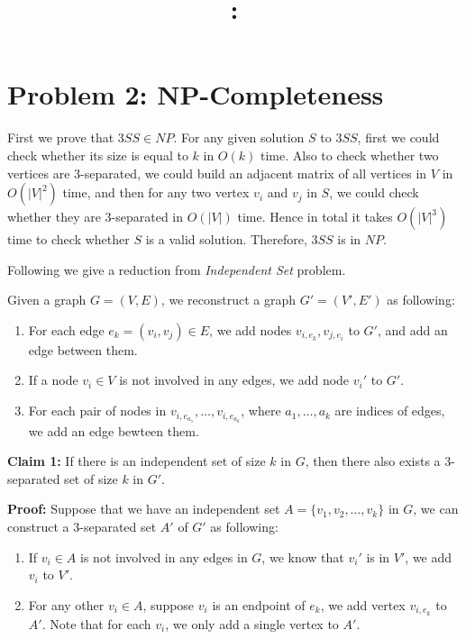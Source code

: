 \documentclass{article}
\title{\textmd{\bf \Class: \Title}}
\date{}
\author{\textbf{\StudentName}}
\begin{document}
\maketitle \thispagestyle{empty}
\section*{Problem 2: NP-Completeness}
First we prove that $3SS \in NP$. For any given solution $S$ to $3SS$, first we could check whether 
its size is equal to $k$ in $O(k)$ time. Also to check whether two vertices are $3$-separated, we
could build an adjacent matrix of all vertices in $V$ in $O(|V|^2)$ time, and then for any two
vertex $v_i$ and $v_j$ in $S$, we could check whether they are $3$-separated in $O(|V|)$ time. Hence
in total it takes $O(|V|^3)$ time to check whether $S$ is a valid solution. Therefore, $3SS$ is in
$NP$.    

Following we give a reduction from \textit{Independent Set} problem.

Given a graph $G = (V, E)$, we reconstruct a graph $G' = (V', E')$ as following:
\begin{enumerate}
  \item For each edge $e_k = (v_i, v_j) \in E$, we add nodes $v_{i, e_k}, v_{j, e_i}$ to $G'$, and add an edge
    between them.
  \item If a node $v_i \in V$ is not involved in any edges, we add node $v_i'$ to $G'$.   
  \item For each pair of nodes in $v_{i, e_{a_1}}, \dots, v_{i, e_{a_k}}$, where $a_1, \dots, a_k$
    are indices of edges,  we add an edge bewteen them.
\end{enumerate}

\textbf{Claim 1:} If there is an independent set of size $k$ in $G$, then there also exists a
$3$-separated set of size $k$ in $G'$.

\textbf{Proof:}
Suppose that we have an independent set $A = \{v_1, v_2, \dots, v_k \}$ in $G$, we can construct a
$3$-separated set $A'$ of $G'$ as following:
\begin{enumerate}
  \item If $v_i \in A$ is not involved in any edges in $G$, we know that $v_i'$ is in $V'$, we add $v_i$ to $V'$.
  \item For any other $v_i \in A$, suppose $v_i$ is an endpoint of $e_k$, we add vertex $v_{i, e_k}$
    to $A'$. Note that for each $v_i$, we only add a single vertex to $A'$.
\end{enumerate}
\end{document}
